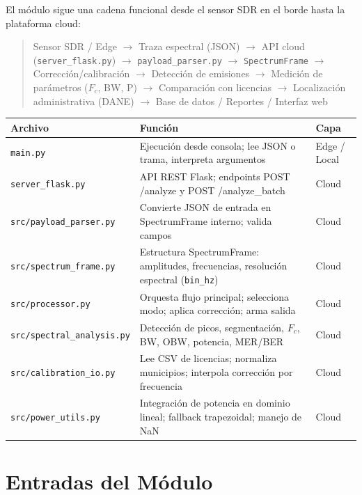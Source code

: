 El módulo sigue una cadena funcional desde el sensor SDR en el borde hasta la plataforma cloud:

\begin{quote}
Sensor SDR / Edge $\rightarrow$ Traza espectral (JSON) $\rightarrow$ API cloud (\texttt{server\_flask.py}) $\rightarrow$ \texttt{payload\_parser.py} $\rightarrow$ \texttt{SpectrumFrame} $\rightarrow$ Corrección/calibración $\rightarrow$ Detección de emisiones $\rightarrow$ Medición de parámetros ($F_c$, BW, P) $\rightarrow$ Comparación con licencias $\rightarrow$ Localización administrativa (DANE) $\rightarrow$ Base de datos / Reportes / Interfaz web
\end{quote}

\begin{tabular}{p{4cm}p{6cm}p{4cm}}
\textbf{Archivo} & \textbf{Función} & \textbf{Capa} \\
\hline
\texttt{main.py} & Ejecución desde consola; lee JSON o trama, interpreta argumentos & Edge / Local \\
\texttt{server\_flask.py} & API REST Flask; endpoints POST /analyze y POST /analyze\_batch & Cloud \\
\texttt{src/payload\_parser.py} & Convierte JSON de entrada en SpectrumFrame interno; valida campos & Cloud \\
\texttt{src/spectrum\_frame.py} & Estructura SpectrumFrame: amplitudes, frecuencias, resolución espectral (\texttt{bin\_hz}) & Cloud \\
\texttt{src/processor.py} & Orquesta flujo principal; selecciona modo; aplica corrección; arma salida & Cloud \\
\texttt{src/spectral\_analysis.py} & Detección de picos, segmentación, $F_c$, BW, OBW, potencia, MER/BER & Cloud \\
\texttt{src/calibration\_io.py} & Lee CSV de licencias; normaliza municipios; interpola corrección por frecuencia & Cloud \\
\texttt{src/power\_utils.py} & Integración de potencia en dominio lineal; fallback trapezoidal; manejo de NaN & Cloud \\
\end{tabular}

\section{Entradas del Módulo}

